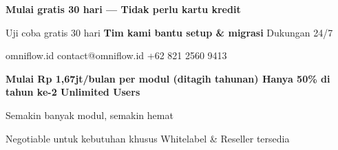 \documentclass[a4paper]{article}
\begin{document}
\vspace{8pt}



{\setlength{\fboxsep}{10pt}\setlength{\fboxrule}{0pt}%
\noindent\colorbox{BluePrimary}{%
    \begin{minipage}{\dimexpr\textwidth-2\fboxsep\relax}
        \centering
        {\fontsize{13}{16}\selectfont\bfseries\color{White}
        Mulai gratis 30 hari --- Tidak perlu kartu kredit}\par\vspace{3pt}
        {\fontsize{9.5}{12}\selectfont\color{BlueMid}
        Uji coba gratis 30 hari \enspace\textbullet\enspace \textbf{Tim kami bantu setup \& migrasi} \enspace\textbullet\enspace Dukungan 24/7}\par\vspace{2pt}
        {\fontsize{9.5}{12}\selectfont\color{BlueLight}
        omniflow.id \enspace\textbullet\enspace contact@omniflow.id \enspace\textbullet\enspace +62 821 2560 9413}
    \end{minipage}}}

\pagestyle{empty}


\vspace{6pt}

{\setlength{\fboxsep}{8pt}\setlength{\fboxrule}{0pt}%
\noindent\colorbox{BlueBg}{%
    \begin{minipage}{\dimexpr\textwidth-2\fboxsep\relax}
        \centering
        {\fontsize{9}{12}\selectfont\bfseries\color{BluePrimary}
        Mulai Rp 1,67jt/bulan per modul (ditagih tahunan) \enspace\textbullet\enspace Hanya 50\% di tahun ke-2 \enspace\textbullet\enspace Unlimited Users}\par\vspace{1pt}
        {\fontsize{8.5}{11}\selectfont\color{BlueDark}
        Semakin banyak modul, semakin hemat}\par\vspace{1pt}
        {\fontsize{8}{10}\selectfont\color{TextLight}
        Negotiable untuk kebutuhan khusus \enspace\textbullet\enspace Whitelabel \& Reseller tersedia}
    \end{minipage}}}


\pagestyle{empty}
\restoregeometry
\end{document}
